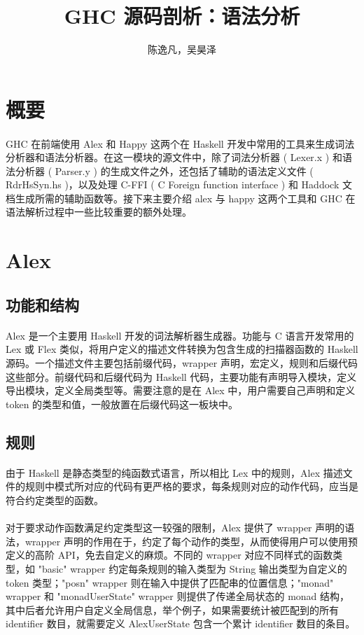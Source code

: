 \documentclass{article}
\author{陈逸凡，吴昊泽}
\title{GHC 源码剖析：语法分析}
\begin{document}
	\maketitle
	
	\section{概要}
	\paragraph{}
	GHC 在前端使用 Alex\cite{alex} 和 Happy\cite{happy} 这两个在 Haskell 开发中常用的工具来生成词法分析器和语法分析器。在这一模块的源文件\cite{ghcparser}中，除了词法分析器 ( Lexer.x ) 和语法分析器 ( Parser.y ) 的生成文件之外，还包括了辅助的语法定义文件 ( RdrHsSyn.hs )，以及处理 C-FFI ( C Foreign function interface ) 和 Haddock 文档生成所需的辅助函数等。接下来主要介绍 alex 与 happy 这两个工具和 GHC 在语法解析过程中一些比较重要的额外处理。
	\section{Alex}
	\subsection{功能和结构}
	\paragraph{}
	Alex\cite{alex} 是一个主要用 Haskell 开发的词法解析器生成器。功能与 C 语言开发常用的 Lex 或 Flex 类似，将用户定义的描述文件转换为包含生成的扫描器函数的 Haskell 源码。一个描述文件主要包括前缀代码，wrapper 声明，宏定义，规则和后缀代码这些部分。前缀代码和后缀代码为 Haskell 代码，主要功能有声明导入模块，定义导出模块，定义全局类型等。需要注意的是在 Alex 中，用户需要自己声明和定义 token 的类型和值，一般放置在后缀代码这一板块中。
	\subsection{规则}
	\paragraph{}
	由于 Haskell 是静态类型的纯函数式语言，所以相比 Lex 中的规则，Alex 描述文件的规则中模式所对应的代码有更严格的要求，每条规则对应的动作代码，应当是符合约定类型的函数。
	\paragraph{}
	对于要求动作函数满足约定类型这一较强的限制，Alex 提供了 wrapper 声明的语法，wrapper 声明的作用在于，约定了每个动作的类型，从而使得用户可以使用预定义的高阶 API，免去自定义的麻烦。不同的 wrapper 对应不同样式的函数类型，如 "basic" wrapper 约定每条规则的输入类型为 String 输出类型为自定义的 token 类型；"posn" wrapper 则在输入中提供了匹配串的位置信息；"monad" wrapper 和 "monadUserState" wrapper 则提供了传递全局状态的 monad 结构，其中后者允许用户自定义全局信息，举个例子，如果需要统计被匹配到的所有 identifier 数目，就需要定义 AlexUserState 包含一个累计 identifier 数目的条目。
\end{document}
